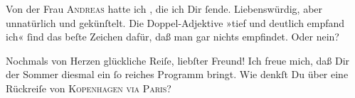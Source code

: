 \pstart
           Von der Frau \textsc{Andreas} hatte ich {\pb}\label{K_L02738-2v}\label{K_L02738-2}, die ich Dir{ }ſende. Liebenswürdig, aber unnatürlich und gekünſtelt. Die  Doppel-Adjektive »tief und deutlich empfand ich«{ }ſind das beſte Zeichen dafür, daß man gar nichts empfindet. Oder nein? {\dotsfour}\pend
           
\pstart
           Nochmals von Herzen glückliche Reiſe, liebſter Freund! Ich freue mich, daß Dir {\pb}der Sommer diesmal ein{ }ſo reiches Programm bringt.
               Wie denkſt Du über eine Rückreiſe von \textsc{Kopenhagen via Paris}?\pend
           
